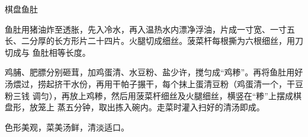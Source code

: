 %
%
%
%
%
%
%
\begin{recipe}{棋盘鱼肚}

\ingredients


\preparation

\step 鱼肚用猪油炸至透胀，先入冷水，再入温热水内漂净浮油，片成一寸宽、一寸五
长、二分厚的长方形片二十四片。火腿切成细丝。菠菜杆每根撕为六根细丝，用刀切成与
鱼肚相等长度。

\step 鸡脯、肥膘分别砸茸，加鸡蛋清、水豆粉、盐少许，搅匀成“鸡糁”。再将鱼肚用好
汤煨过，捞起挤干水份，再用干帕子搌干，每个抹上蛋清豆粉（鸡蛋清一个，干豆粉三钱
调匀），再放上鸡糁，然后用菠菜杆细丝及火腿细丝，横竖在“糁”上摆成棋盘形，放笼上
蒸五分钟，取出拣入碗内。走菜时灌入扫好的清汤即成。

\features

色形美观，菜美汤鲜，清淡适口。

\end{recipe}

